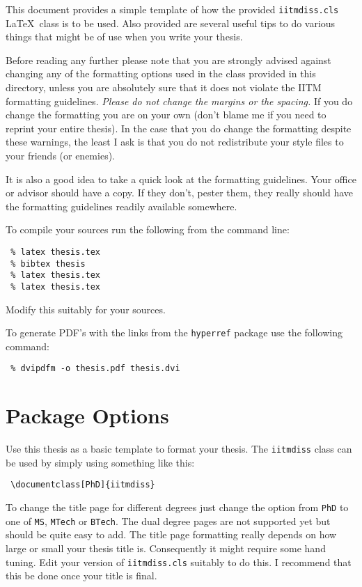 \documentclass[MTech]{iitmdiss}
\begin{document}
 This document provides a simple template of how the provided
 \verb+iitmdiss.cls+ \LaTeX\ class is to be used.  Also provided are
 several useful tips to do various things that might be of use when you
 write your thesis.
 
 Before reading any further please note that you are strongly advised
 against changing any of the formatting options used in the class
 provided in this directory, unless you are absolutely sure that it
 does not violate the IITM formatting guidelines.  \emph{Please do not
   change the margins or the spacing.}  If you do change the formatting
 you are on your own (don't blame me if you need to reprint your entire
 thesis).  In the case that you do change the formatting despite these
 warnings, the least I ask is that you do not redistribute your style
 files to your friends (or enemies).
 
 It is also a good idea to take a quick look at the formatting
 guidelines.  Your office or advisor should have a copy.  If they
 don't, pester them, they really should have the formatting guidelines
 readily available somewhere.
 
 To compile your sources run the following from the command line:
 \begin{verbatim}
 % latex thesis.tex
 % bibtex thesis
 % latex thesis.tex
 % latex thesis.tex
 \end{verbatim}
 Modify this suitably for your sources.
 
 To generate PDF's with the links from the \verb+hyperref+ package use
 the following command:
 \begin{verbatim}
 % dvipdfm -o thesis.pdf thesis.dvi
 \end{verbatim}
 
 \section{Package Options}
 
 Use this thesis as a basic template to format your thesis.  The
 \verb+iitmdiss+ class can be used by simply using something like this:
 \begin{verbatim}
 \documentclass[PhD]{iitmdiss}  
 \end{verbatim}
 
 To change the title page for different degrees just change the option
 from \verb+PhD+ to one of \verb+MS+, \verb+MTech+ or \verb+BTech+.
 The dual degree pages are not supported yet but should be quite easy
 to add.  The title page formatting really depends on how large or
 small your thesis title is.  Consequently it might require some hand
 tuning.  Edit your version of \verb+iitmdiss.cls+ suitably to do this.
 I recommend that this be done once your title is final.
 
\end{document}
